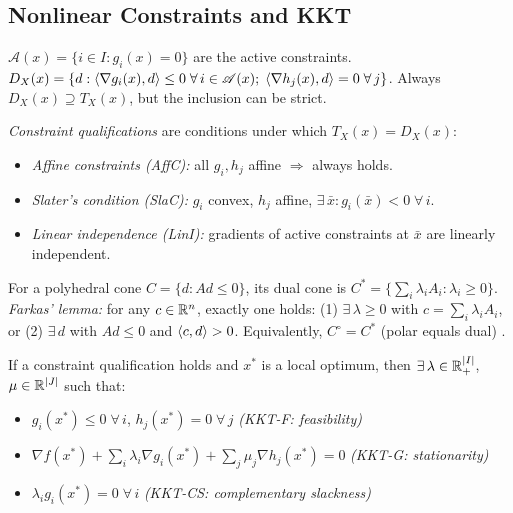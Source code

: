 \subsection{Nonlinear Constraints and KKT}\label{ssec:kkt}

\begin{defn}\label{def:active-dx}
	$\mathcal{A}(x) = \{i \in I : g_i(x) = 0\}$ are the active constraints.
	$D_X(x) = \{d : \langle\nabla g_i(x), d\rangle \leq 0\;\forall\, i \in \mathcal{A}(x);\; \langle\nabla h_j(x), d\rangle = 0\;\forall\, j\}$.
	Always $D_X(x) \supseteq T_X(x)$, but the inclusion can be strict.
\end{defn}

\textit{Constraint qualifications} are conditions under which $T_X(x) = D_X(x)$:
\begin{itemize}
	\item \textit{Affine constraints (AffC):} all $g_i, h_j$ affine $\Rightarrow$ always holds.
	\item \textit{Slater's condition (SlaC):} $g_i$ convex, $h_j$ affine, $\exists\, \bar{x} : g_i(\bar{x}) < 0\;\forall\, i$.
	\item \textit{Linear independence (LinI):} gradients of active constraints at $\bar{x}$ are linearly independent.
\end{itemize}

\begin{defn}\label{def:farkas}
	For a polyhedral cone $C = \{d : Ad \leq 0\}$, its dual cone is $C^* = \{\sum_i \lambda_i A_i : \lambda_i \geq 0\}$.
	\textit{Farkas' lemma:} for any $c \in \mathbb{R}^n$, exactly one holds: (1) $\exists\, \lambda \geq 0$ with $c = \sum_i \lambda_i A_i$, or (2) $\exists\, d$ with $Ad \leq 0$ and $\langle c, d\rangle > 0$.
	Equivalently, $C^\circ = C^*$ (polar equals dual) \cite{bazaraa2006}.
\end{defn}

\begin{thm}\label{thm:kkt}
	If a constraint qualification holds and $x^*$ is a local optimum, then $\exists\, \lambda \in \mathbb{R}_+^{|I|}$, $\mu \in \mathbb{R}^{|J|}$ such that:
	\begin{itemize}
		\item $g_i(x^*) \leq 0\;\forall\, i$, $h_j(x^*) = 0\;\forall\, j$ \hfill\textit{(KKT-F: feasibility)}
		\item $\nabla f(x^*) + \sum_i \lambda_i \nabla g_i(x^*) + \sum_j \mu_j \nabla h_j(x^*) = 0$ \hfill\textit{(KKT-G: stationarity)}
		\item $\lambda_i g_i(x^*) = 0\;\forall\, i$ \hfill\textit{(KKT-CS: complementary slackness)}
	\end{itemize}
\end{thm}

